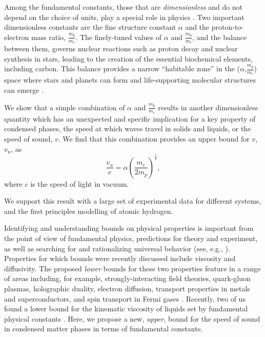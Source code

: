 \documentclass[aps,prl,groupedaddress,fleqn,twocolumn,10pt]{revtex4-1}
\begin{document}
Among the fundamental constants, those that are {\it dimensionless} and do not depend on the choice of units, play a special role in physics \cite{barrow}. Two important dimensionless constants are the fine structure constant $\alpha$ and the proton-to-electron mass ratio, $\frac{m_p}{m_e}$. The finely-tuned values of $\alpha$ and $\frac{m_p}{m_e}$, and the balance between them, governs nuclear reactions such as proton decay and nuclear synthesis in stars, leading to the creation of the essential biochemical elements, including carbon. This balance provides a narrow ``habitable zone'' in the ($\alpha$,$\frac{m_p}{m_e}$) space where stars and planets can form and life-supporting molecular structures can emerge \cite{barrow}.

We show that a simple combination of $\alpha$ and $\frac{m_p}{m_e}$ results in another dimensionless quantity which has an unexpected and specific implication for a key property of condensed phases, the speed at which waves travel in solids and liquids, or the speed of sound, $v$. We find that this combination provides an upper bound for $v$, $v_u$, as
\begin{equation}
\frac{v_u}{c}=\alpha\left(\frac{m_e}{2m_p}\right)^{\frac{1}{2}},
\label{v0}
\end{equation}
\noindent where $c$ is the speed of light in vacuum.

We support this result with a large set of experimental data for different systems, and the first principles modelling of atomic hydrogen.

Identifying and understanding bounds on physical properties is important from the point of view of fundamental physics, predictions for theory and experiment, as well as searching for and rationalizing universal behavior (see, e.g., \cite{kss,zaanen3,hartnoll,zaanen2,spin,behnia,zaanen1,behnia1,hartnoll1}). Properties for which bounds were recently discussed include viscosity and diffusivity. The proposed {\it lower} bounds for these two properties feature in a range of areas including, for example, strongly-interacting field theories, quark-gluon plasmas, holographic duality, electron diffusion, transport properties in metals and superconductors, and spin transport in Fermi gases \cite{kss,zaanen3,hartnoll,zaanen2,spin,behnia,zaanen1,behnia1,hartnoll1}. Recently, two of us found a lower bound for the kinematic viscosity of liquids set by fundamental physical constants \cite{sciadv}. Here, we propose a new, {\it upper}, bound for the speed of sound in condensed matter phases in terms of fundamental constants.
\end{document}
